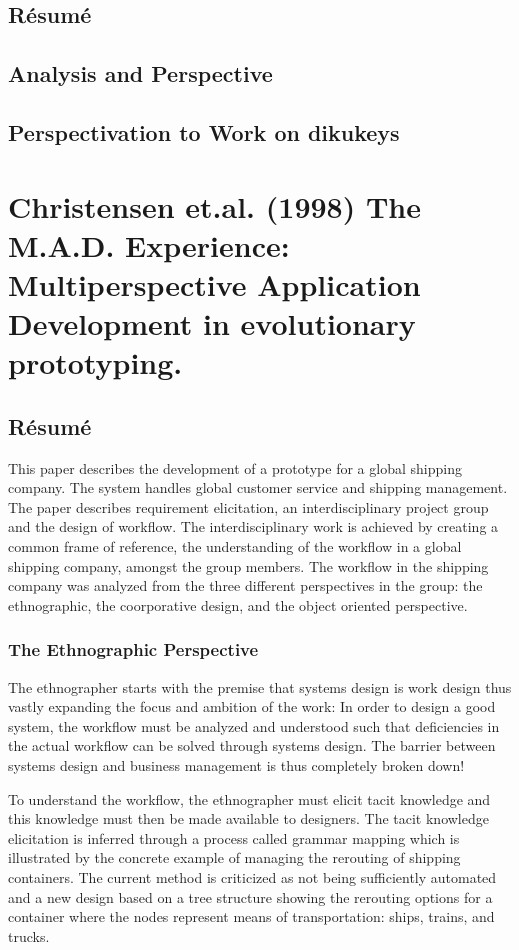 \documentclass[11pt,a4paper]{report}
\begin{document}
\subsection{Résumé}
\subsection{Analysis and Perspective}
\subsection{Perspectivation to Work on dikukeys}

\newpage
\section{Christensen et.al. (1998) The M.A.D. Experience: Multiperspective Application Development in evolutionary prototyping.}
\subsection{Résumé}
This paper describes the development of a prototype for a global shipping company. The system handles global customer service and shipping management. The paper describes requirement elicitation, an interdisciplinary project group and the design of workflow. The interdisciplinary work is achieved by creating a common frame of reference, the understanding of the workflow in a global shipping company, amongst the group members. The workflow in the shipping company was analyzed from the three different perspectives in the group: the ethnographic, the coorporative design, and the object oriented perspective. 
\subsubsection{The Ethnographic Perspective}
The ethnographer starts with the premise that systems design is work design thus vastly expanding the focus and ambition of the work: In order to design a good system, the workflow must be analyzed and understood such that deficiencies in the actual workflow can be solved through systems design. The barrier between systems design and business management is thus completely broken down!

To understand the workflow, the ethnographer must elicit tacit knowledge and this knowledge must then be made available to designers. The tacit knowledge elicitation is inferred through a process called grammar mapping which is illustrated by the concrete example of managing the rerouting of shipping containers. The current method is criticized as not being sufficiently automated and a new design based on a tree structure showing the rerouting options for a container where the nodes represent means of transportation: ships, trains, and trucks.
\end{document}
